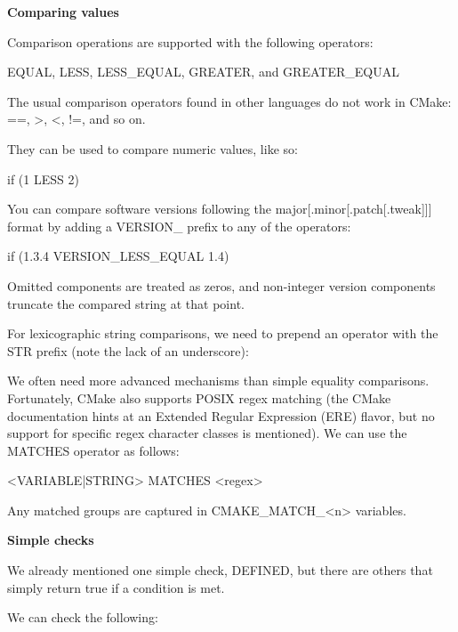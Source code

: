 \noindent
\textbf{Comparing values}

Comparison operations are supported with the following operators:

EQUAL, LESS, LESS\_EQUAL, GREATER, and GREATER\_EQUAL

The usual comparison operators found in other languages do not work in CMake: ==, >, <, !=, and so on.

They can be used to compare numeric values, like so:

\begin{cmake}
if (1 LESS 2)
\end{cmake}

You can compare software versions following the major[.minor[.patch[.tweak]]] format by adding a VERSION\_ prefix to any of the operators:

\begin{cmake}
if (1.3.4 VERSION_LESS_EQUAL 1.4)
\end{cmake}

Omitted components are treated as zeros, and non-integer version components truncate the compared string at that point.

For lexicographic string comparisons, we need to prepend an operator with the STR prefix (note the lack of an underscore):


We often need more advanced mechanisms than simple equality comparisons. Fortunately, CMake also supports POSIX regex matching (the CMake documentation hints at an Extended Regular Expression (ERE) flavor, but no support for specific regex character classes is mentioned). We can use the MATCHES operator as follows:

\begin{shell}
<VARIABLE|STRING> MATCHES <regex>
\end{shell}

Any matched groups are captured in CMAKE\_MATCH\_<n> variables.

\noindent
\textbf{Simple checks}

We already mentioned one simple check, DEFINED, but there are others that simply return true if a condition is met.

We can check the following:

